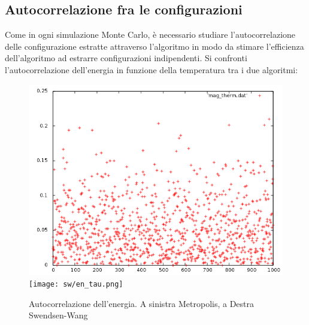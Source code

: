 \subsection{Autocorrelazione fra le configurazioni}
Come in ogni simulazione Monte Carlo, è necessario studiare l'autocorrelazione delle configurazione estratte attraverso l'algoritmo in modo da stimare l'efficienza dell'algoritmo ad estrarre configurazioni
indipendenti. Si confronti l'autocorrelazione dell'energia in funzione della temperatura tra i due algoritmi:
\begin{figure}[h]
\includegraphics[scale=0.35]{sw/mag_therm0-3.png}
\texttt{[image: sw/en\_tau.png]}
\caption{Autocorrelazione dell'energia. A sinistra Metropolis, a Destra Swendsen-Wang}
\end{figure}




